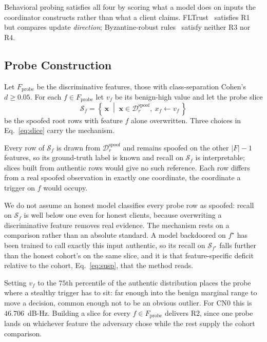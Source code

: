 \documentclass[conference]{IEEEtran}
\begin{document}
Behavioral probing satisfies all four by scoring what a model does on inputs
the coordinator constructs rather than what a client claims.
FLTrust~\cite{cao2021fltrust} satisfies R1 but compares update
\emph{direction}; Byzantine-robust
rules~\cite{blanchard2017machine,yin2018byzantine} satisfy neither R3 nor R4.

\subsection{Probe Construction}

Let $F_{\mathrm{probe}}$ be the discriminative features, those with
class-separation Cohen's $d\ge 0.05$. For each $f\in F_{\mathrm{probe}}$ let
$v_f$ be its benign-high value and let the probe slice
\begin{equation}
\mathcal{S}_f=\left\{\,\mathbf{x}\;\middle|\;\mathbf{x}\in\mathcal{D}_r^{\mathrm{spoof}},\ x_f\!\leftarrow\!v_f\,\right\}
\label{eq:slice}
\end{equation}
be the spoofed root rows with feature $f$ alone overwritten. Three choices in
Eq.~\eqref{eq:slice} carry the mechanism.

Every row of $\mathcal{S}_f$ is drawn from $\mathcal{D}_r^{\mathrm{spoof}}$ and
remains spoofed on the other $|F|-1$ features, so its ground-truth label is
known and recall on $\mathcal{S}_f$ is interpretable; slices built from
authentic rows would give no such reference. Each row differs from a real
spoofed observation in exactly one coordinate, the coordinate a trigger on $f$
would occupy.

We do not assume an honest model classifies every probe row as spoofed: recall
on $\mathcal{S}_f$ is well below one even for honest clients, because
overwriting a discriminative feature removes real evidence. The mechanism rests
on a comparison rather than an absolute standard. A model backdoored on
$f^\star$ has been trained to call exactly this input authentic, so its recall
on $\mathcal{S}_{f^\star}$ falls further than the honest cohort's on the same
slice, and it is that feature-specific deficit relative to the cohort,
Eq.~\eqref{eq:susp}, that the method reads.

Setting $v_f$ to the $75$th percentile of the authentic distribution places the
probe where a stealthy trigger has to sit: far enough into the benign marginal
range to move a decision, common enough not to be an obvious outlier. For CN0
this is $46.706$~dB-Hz. Building a slice for every $f\in F_{\mathrm{probe}}$
delivers R2, since one probe lands on whichever feature the adversary chose
while the rest supply the cohort comparison.
\end{document}
